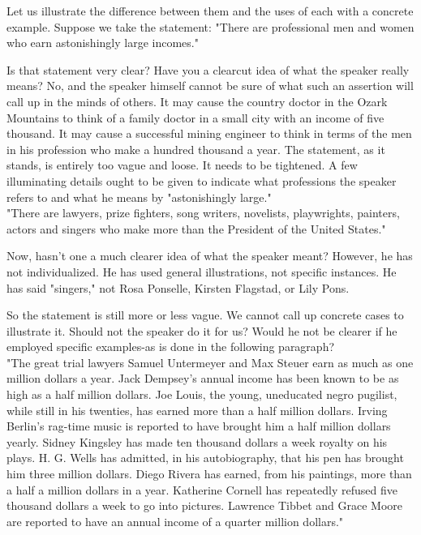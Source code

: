 \documentclass[10pt]{article}
\begin{document}
Let us illustrate the difference between them and the uses of each with a concrete example. Suppose we take the statement: "There are professional men and women who earn astonishingly large incomes."

Is that statement very clear? Have you a clearcut idea of what the speaker really means? No, and the speaker himself cannot be sure of what such an assertion will call up in the minds of others. It may cause the country doctor in the Ozark Mountains to think of a family doctor in a small city with an income of five thousand. It may cause a successful mining engineer to think in terms of the men in his profession who make a hundred thousand a year. The statement, as it stands, is entirely too vague and loose. It needs to be tightened. A few illuminating details ought to be given to indicate what professions the speaker refers to and what he means by "astonishingly large."\\
"There are lawyers, prize fighters, song writers, novelists, playwrights, painters, actors and singers who make more than the President of the United States."

Now, hasn't one a much clearer idea of what the speaker meant? However, he has not individualized. He has used general illustrations, not specific instances. He has said "singers," not Rosa Ponselle, Kirsten Flagstad, or Lily Pons.

So the statement is still more or less vague. We cannot call up concrete cases to illustrate it. Should not the speaker do it for us? Would he not be clearer if he employed specific examples-as is done in the following paragraph?\\
"The great trial lawyers Samuel Untermeyer and Max Steuer earn as much as one million dollars a year. Jack Dempsey's annual income has been known to be as high as a half million dollars. Joe Louis, the young, uneducated negro pugilist, while still in his twenties, has earned more than a half million dollars. Irving Berlin's rag-time music is reported to have brought him a half million dollars yearly. Sidney Kingsley has made ten thousand dollars a week royalty on his plays. H. G. Wells has admitted, in his autobiography, that his pen has brought him three million dollars. Diego Rivera has earned, from his paintings, more than a half a million dollars in a year. Katherine Cornell has repeatedly refused five thousand dollars a week to go into pictures. Lawrence Tibbet and Grace Moore are reported to have an annual income of a quarter million dollars."
\end{document}
